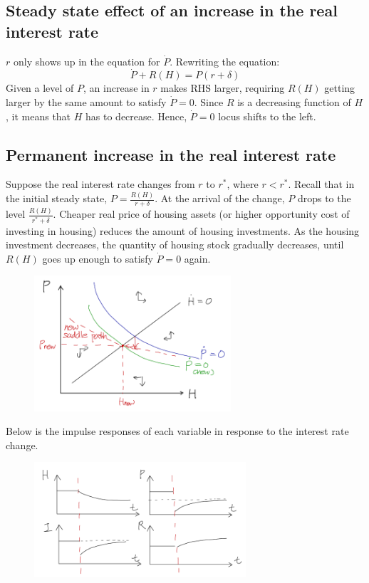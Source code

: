 \documentclass[11pt]{amsart}
\begin{document}
\subsection{Steady state effect of an increase in the real interest rate}
$r$ only shows up in the equation for $\dot{P}$. Rewriting the equation: 
\begin{equation*}
\dot{P} + R(H) = P (r + \delta)
\end{equation*}
Given a level of $P$, an increase in $r$ makes RHS larger, requiring $R(H)$ getting larger by the same amount to satisfy $\dot{P} = 0$. Since $R$ is a decreasing function of $H$, it means that $H$ has to decrease. Hence, $\dot{P} = 0$ locus shifts to the left. 

\subsection{Permanent increase in the real interest rate} Suppose the real interest rate changes from $r$ to $r^{*}$, where $r < r^{*}$. Recall that in the initial steady state, $P = \frac{R(H)}{r+\delta}$. At the arrival of the change, $P$ drops to the level $\frac{R(H)}{r^{*} + \delta}$. Cheaper real price of housing assets (or higher opportunity cost of investing in housing) reduces the amount of housing investments. As the housing investment decreases, the quantity of housing stock gradually decreases, until $R(H)$ goes up enough to satisfy $\dot{P}=0$ again.   
\begin{figure}[H]
	\centering
	\includegraphics[width=0.65\textwidth]{1e1_Minki.png}
\end{figure}
Below is the impulse responses of each variable in response to the interest rate change. 
\begin{figure}[H]
	\centering
	\includegraphics[width=0.7\textwidth]{1e2_Minki.png}
\end{figure}
\end{document}
